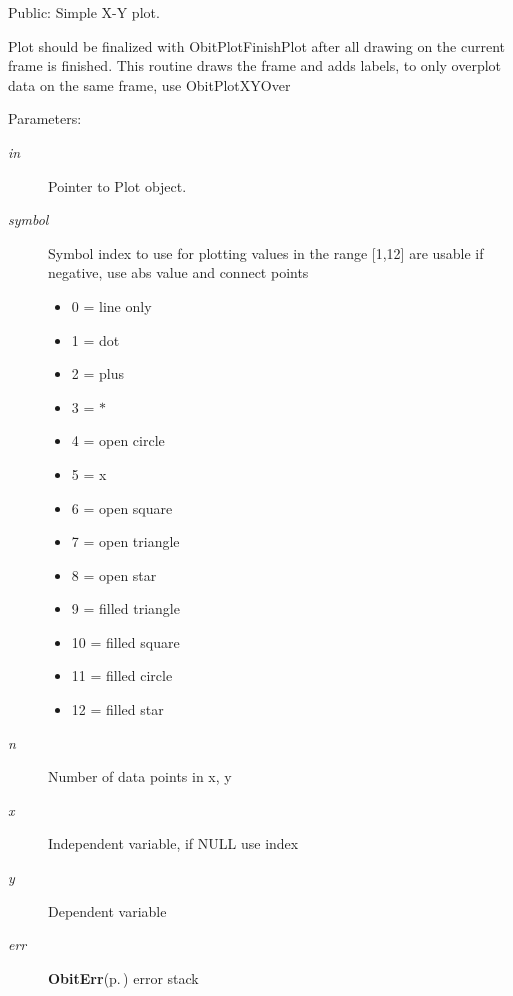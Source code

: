 Public: Simple X-Y plot. 

Plot should be finalized with Obit\-Plot\-Finish\-Plot after all drawing on the current frame is finished. This routine draws the frame and adds labels, to only overplot data on the same frame, use Obit\-Plot\-XYOver \begin{Desc}
\item[Parameters:]
\begin{description}
\item[{\em in}]Pointer to Plot object. \item[{\em symbol}]Symbol index to use for plotting values in the range [1,12] are usable if negative, use abs value and connect points \begin{itemize}
\item 0 = line only \item 1 = dot \item 2 = plus \item 3 = $\ast$ \item 4 = open circle \item 5 = x \item 6 = open square \item 7 = open triangle \item 8 = open star \item 9 = filled triangle \item 10 = filled square \item 11 = filled circle \item 12 = filled star\end{itemize}
\item[{\em n}]Number of data points in x, y \item[{\em x}]Independent variable, if NULL use index \item[{\em y}]Dependent variable \item[{\em err}]{\bf Obit\-Err}{\rm (p.\,\pageref{structObitErr})} error stack\end{description}
\end{Desc}

